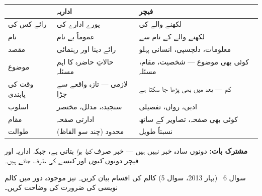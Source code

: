 \begin{hal}
\begin{center}
\begin{tabular}{@{}p{2.8cm} p{5.8cm} p{5.8cm}@{}}
\toprule
 & \textbf{اداریہ} & \textbf{فیچر} \\
\midrule
رائے کس کی & پورے ادارے کی & لکھنے والے کی \\
نام & عموماً بے نام & لکھنے والے کے نام سے \\
مقصد & رائے دینا اور رہنمائی & معلومات، دلچسپی، انسانی پہلو \\
موضوع & حالاتِ حاضرہ کا اہم مسئلہ & کوئی بھی موضوع --- شخصیت، مقام، مسئلہ \\
وقت کی پابندی & لازمی --- تازہ واقعے سے جڑا & کم --- بعد میں بھی پڑھا جا سکتا ہے \\
اسلوب & سنجیدہ، مدلل، مختصر & ادبی، رواں، تفصیلی \\
مقام & ادارتی صفحہ & کوئی بھی صفحہ، تصاویر کے ساتھ \\
طوالت & محدود (چند سو الفاظ) & نسبتاً طویل \\
\bottomrule
\end{tabular}
\end{center}

\medskip
\textbf{مشترک بات:} دونوں سادہ خبر نہیں ہیں --- خبر صرف \emph{کیا ہوا} بتاتی
ہے، جبکہ اداریہ اور فیچر دونوں \emph{کیوں} اور \emph{کیسے} کی طرف جاتے ہیں۔

\end{hal}

\begin{sawal}{سوال \textenglish{6} \ \textnormal{\small(بہار \textenglish{2013}، سوال \textenglish{5})}}
کالم کی اقسام بیان کریں۔ نیز موجودہ دور میں کالم نویسی کی ضرورت کی وضاحت کریں۔
\end{sawal}

